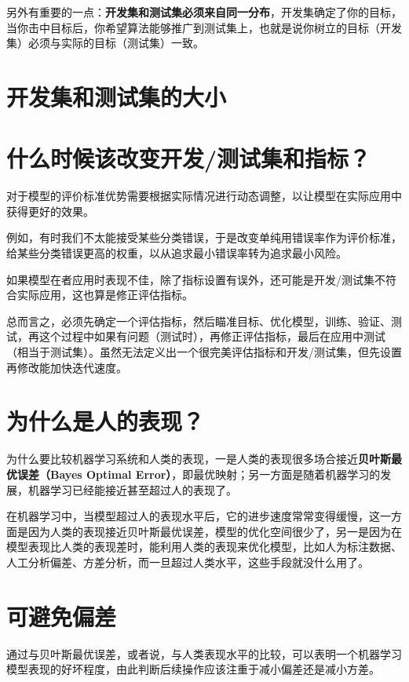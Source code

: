 \documentclass[../../main.tex]{subfiles}
\begin{document}
另外有重要的一点：\textbf{开发集和测试集必须来自同一分布}，开发集确定了你的目标，当你击中目标后，你希望算法能够推广到测试集上，也就是说你树立的目标（开发集）必须与实际的目标（测试集）一致。

\section{开发集和测试集的大小}

\section{什么时候该改变开发/测试集和指标？}
对于模型的评价标准优势需要根据实际情况进行动态调整，以让模型在实际应用中获得更好的效果。

例如，有时我们不太能接受某些分类错误，于是改变单纯用错误率作为评价标准，给某些分类错误更高的权重，以从追求最小错误率转为追求最小风险。

如果模型在者应用时表现不佳，除了指标设置有误外，还可能是开发/测试集不符合实际应用，这也算是修正评估指标。

总而言之，必须先确定一个评估指标，然后瞄准目标、优化模型，训练、验证、测试，再这个过程中如果有问题（测试时），再修正评估指标，最后在应用中测试（相当于测试集）。虽然无法定义出一个很完美评估指标和开发/测试集，但先设置再修改能加快迭代速度。

\section{为什么是人的表现？}
为什么要比较机器学习系统和人类的表现，一是人类的表现很多场合接近\textbf{贝叶斯最优误差（Bayes Optimal Error）}，即最优映射；另一方面是随着机器学习的发展，机器学习已经能接近甚至超过人的表现了。

在机器学习中，当模型超过人的表现水平后，它的进步速度常常变得缓慢，这一方面是因为人类的表现接近贝叶斯最优误差，模型的优化空间很少了，另一是因为在模型表现比人类的表现差时，能利用人类的表现来优化模型，比如人为标注数据、人工分析偏差、方差分析，而一旦超过人类水平，这些手段就没什么用了。

\section{可避免偏差}
通过与贝叶斯最优误差，或者说，与人类表现水平的比较，可以表明一个机器学习模型表现的好坏程度，由此判断后续操作应该注重于减小偏差还是减小方差。
\end{document}
